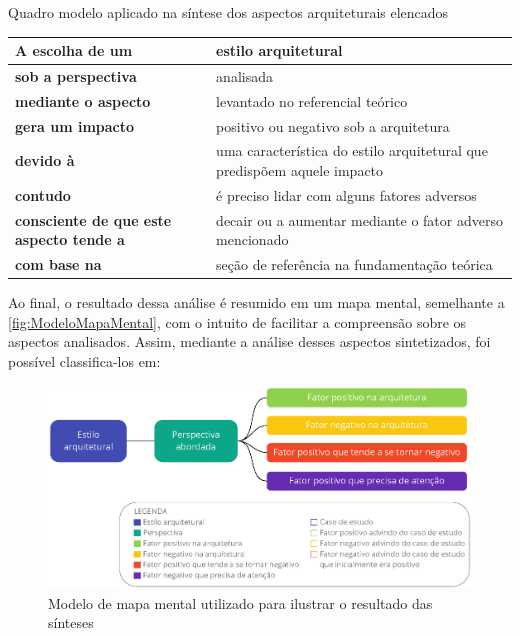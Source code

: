 \begin{quadro}
    \caption{Quadro modelo aplicado na síntese dos aspectos arquiteturais elencados\label{modelo-sintese}}
    \begin{tabularx}{\linewidth}{ | p{5cm} | X | }
    \hline
    \textbf{A escolha de um}        &  estilo arquitetural \\ \hline
    \textbf{sob a perspectiva}      &  analisada \\ \hline
    \textbf{mediante o aspecto}     &  levantado no referencial teórico \\ \hline
    \textbf{gera um impacto}        &  positivo ou negativo sob a arquitetura \\ \hline
    \textbf{devido à }              &  uma característica do estilo arquitetural que predispõem aquele impacto \\ \hline
    \textbf{contudo}                &  é preciso lidar com alguns fatores adversos \\ \hline
    \textbf{consciente de que este aspecto tende a } & decair ou a aumentar mediante o fator adverso mencionado \\ \hline
    \textbf{com base na}            &  seção de referência na fundamentação teórica \\ \hline
    \end{tabularx}
\end{quadro}

Ao final, o resultado dessa análise é resumido em um mapa mental, semelhante a
\autoref{fig:ModeloMapaMental}, com o intuito de facilitar a compreensão sobre os aspectos
analisados. Assim, mediante a análise desses aspectos sintetizados, foi possível classifica-los em:

\begin{figure}[h]
  \centering
  \includegraphics[keepaspectratio=true,scale=0.6]{figuras/modelo-mapa-mental.eps}
  \caption{Modelo de mapa mental utilizado para ilustrar o resultado das sínteses\label{fig:ModeloMapaMental}}
\end{figure}

